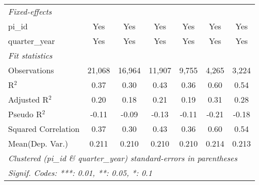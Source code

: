\begin{tabular}{lcccccc}
   \midrule
   \emph{Fixed-effects}\\
   pi\_id                                                     & Yes             & Yes             & Yes           & Yes           & Yes            & Yes\\  
   quarter\_year                                              & Yes             & Yes             & Yes           & Yes           & Yes            & Yes\\  
   \midrule
   \emph{Fit statistics}\\
   Observations                                               & 21,068          & 16,964          & 11,907        & 9,755         & 4,265          & 3,224\\  
   R$^2$                                                      & 0.37            & 0.30            & 0.43          & 0.36          & 0.60           & 0.54\\  
   Adjusted R$^2$                                             & 0.20            & 0.18            & 0.21          & 0.19          & 0.31           & 0.28\\  
   Pseudo R$^2$                                               & -0.11           & -0.09           & -0.13         & -0.11         & -0.21          & -0.18\\  
   Squared Correlation                                        & 0.37            & 0.30            & 0.43          & 0.36          & 0.60           & 0.54\\  
Mean(Dep. Var.) & 0.211 & 0.210 & 0.210 & 0.210 & 0.214 & 0.213 \\
   \midrule \midrule
   \multicolumn{7}{l}{\emph{Clustered (pi\_id \& quarter\_year) standard-errors in parentheses}}\\
   \multicolumn{7}{l}{\emph{Signif. Codes: ***: 0.01, **: 0.05, *: 0.1}}\\
\end{tabular}
\par\endgroup

